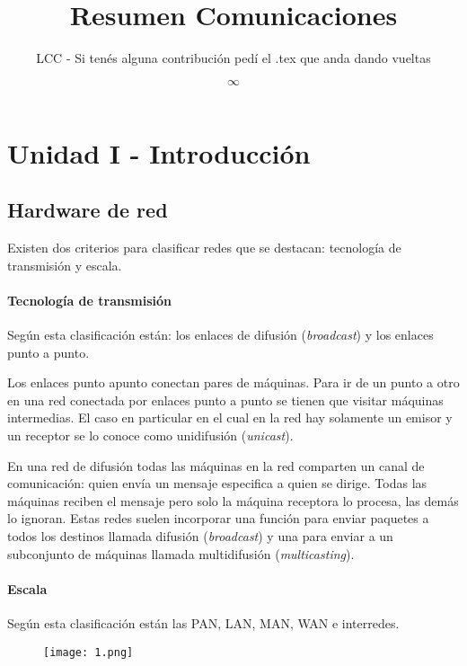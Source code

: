 \documentclass{book}
\title{Resumen Comunicaciones}
\author{LCC - Si tenés alguna contribución pedí el .tex que anda dando vueltas}
\date{$\infty$}
\begin{document}
	\maketitle
	\tableofcontents
	
	\chapter{Unidad I - Introducción}
	
	\section{Hardware de red}
	Existen dos criterios para clasificar redes que se destacan: tecnología de transmisión y escala.
	
	\subsubsection{Tecnología de transmisión}
	Según esta clasificación están: los enlaces de difusión (\textit{broadcast}) y los enlaces punto a punto.
	
	\vspace{3mm}
	Los enlaces punto apunto conectan pares de máquinas. Para ir de un punto a otro en una red conectada por enlaces punto a punto se tienen que visitar máquinas intermedias. El caso en particular en el cual en la red hay solamente un emisor y un receptor se lo conoce como unidifusión (\textit{unicast}).
	
	\vspace{3mm}
	En una red de difusión todas las máquinas en la red comparten un canal de comunicación: quien envía un mensaje especifica a quien se dirige. Todas las máquinas reciben el mensaje pero solo la máquina receptora lo procesa, las demás lo ignoran. Estas redes suelen incorporar una función para enviar paquetes a todos los destinos llamada difusión (\textit{broadcast}) y una para enviar a un subconjunto de máquinas llamada multidifusión (\textit{multicasting}).
	
	\subsubsection{Escala} Según esta clasificación están las PAN, LAN, MAN, WAN e interredes.
	
	\begin{figure}[H]
		\centering
		\texttt{[image: 1.png]}
	\end{figure}
	
\end{document}
